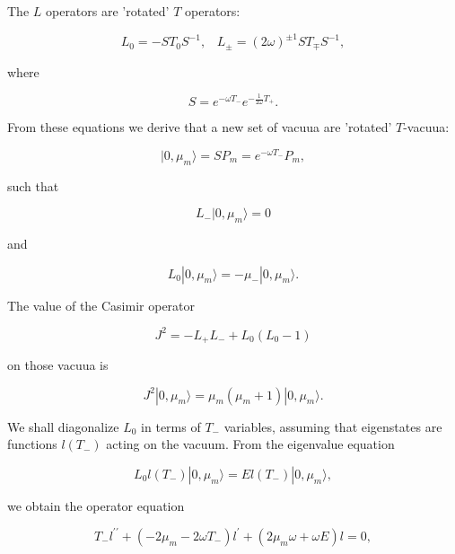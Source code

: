 \documentclass[a4paper,preprint,aps]{revtex4}
\begin{document}
 The $L$ operators are 'rotated' $T$ operators:


\begin{equation}
	L_{0}=-ST_{0}S^{-1},\;\;\; L_{\pm}=(2\omega)^{\pm 1} ST_{\mp}S^{-1}, 
\end{equation}

where  

\begin{equation}
	S=e^{-\omega T_{-}} e^{-\frac{1}{2 \omega} T_{+}}.
\end{equation}

From these equations we derive that a new set of vacuua are 'rotated'
 $T$-vacuua:


\begin{equation}
	|0,\mu_{m}\rangle = SP_{m} = e^{-\omega T_{-}} P_{m},
\end{equation}

such that


\begin{equation}
	L_{-}|0,\mu_{m}\rangle =0
\end{equation}

and

\begin{equation}
	L_{0}|0,\mu_{m}\rangle =-\mu_{-}|0,\mu_{m}\rangle .
\end{equation}

The value of the Casimir operator


\begin{equation}
	J^{2}=-L_{+}L_{-}+L_{0}(L_{0}-1)
\end{equation}

on those vacuua is


\begin{equation}
	J^{2}|0,\mu_{m}\rangle = \mu_{m}(\mu_{m}+1)|0,\mu_{m}\rangle .
\end{equation}

We shall diagonalize $L_{0}$ in terms of $T_{-}$ variables, assuming that
 eigenstates are functions $l(T_{-})$ acting on the vacuum.
From the eigenvalue equation

    
\begin{equation}
	L_{0}l(T_{-})|0,\mu_{m}\rangle = El(T_{-})|0,\mu_{m}\rangle ,
\end{equation}

we obtain the operator equation

\begin{equation}
	T_{-}l^{\prime \prime}+(-2\mu_{m}-2\omega T_{-})l^{\prime}+
	(2\mu_{m}\omega + \omega E)l=0,
\end{equation}
\end{document}
